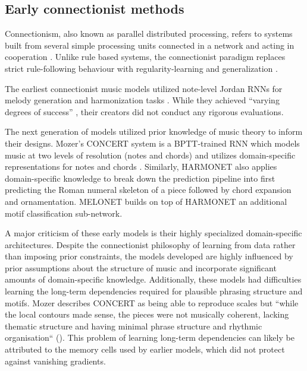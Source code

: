 \subsection{Early connectionist methods}

Connectionism, also known as parallel distributed processing, refers to systems
built from several simple processing units connected in a network and acting in
cooperation \citep{pdp1986parallel}. Unlike rule based systems, the
connectionist paradigm replaces strict rule-following behaviour with
regularity-learning and generalization \citep{dolson1989machine}.

The earliest connectionist music models utilized note-level Jordan
RNNs\cite{jordan1997serial} for melody generation and harmonization tasks
\citep{todd1988sequential,todd1989connectionist,bharucha1989modeling}.
While they achieved ``varying degrees of success'' \citep{griffith1999musical},
their creators did not conduct any rigorous evaluations.

The next generation of models utilized prior knowledge of music theory to
inform their designs. Mozer's CONCERT \citep{mozer1994neural} system is a BPTT-trained
RNN which models music at two levels of resolution (notes and chords) and
utilizes domain-specific representations for notes
\citep{shepard1982geometrical} and chords \citep{laden1989representation}.
Similarly, HARMONET \citep{hild1991harmonet} also applies domain-specific
knowledge to break down the prediction pipeline into first predicting the Roman
numeral skeleton of a piece followed by chord expansion and ornamentation.
MELONET \citep{feulner1994melonet,hornel1997melonet} builds on top of HARMONET
an additional motif classification sub-network.

A major criticism of these early models is their highly specialized
domain-specific architectures. Despite the connectionist philosophy of learning
from data rather than imposing prior constraints, the models developed are
highly influenced by prior assumptions about the structure of music and
incorporate significant amounts of domain-specific knowledge. Additionally,
these models had difficulties learning the long-term dependencies required for
plausible phrasing structure and motifs. Mozer describes CONCERT as being able
to reproduce scales but ``while the local contours made sense, the pieces were
not musically coherent, lacking thematic structure and having minimal phrase
structure and rhythmic organisation`` (\citet{mozer1994neural}). This problem of
learning long-term dependencies can likely be attributed to the memory cells
used by earlier models, which did not protect against vanishing gradients.

